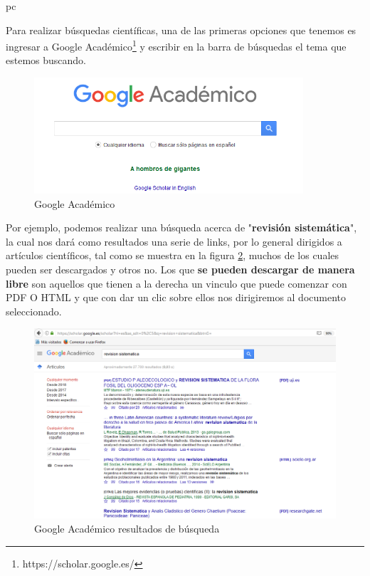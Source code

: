 pc\documentclass[a4paper,12pt,openany]{book}
\begin{document}
\begin{itemize}
Para realizar búsquedas científicas, una de las primeras opciones que tenemos es ingresar a Google Académico\footnote{https://scholar.google.es/} y escribir en la barra de búsquedas el tema que estemos buscando.

\begin{figure}[ht]
  \centering
	\includegraphics[width=10cm]{google2.png}
\caption{Google Académico}
  \label{fig:google2}
\end{figure}

Por ejemplo, podemos realizar una búsqueda acerca de "\textbf{revisión sistemática}", la cual nos dará como resultados una serie de links, por lo general dirigidos a artículos científicos, tal como se muestra en la figura \ref{fig:google33}, muchos de los cuales pueden ser descargados y otros no. Los que \textbf{se pueden descargar de manera libre} son aquellos que tienen a la derecha un vinculo que puede comenzar con PDF O HTML y que con dar un clic sobre ellos nos dirigiremos al documento seleccionado. \\

\begin{figure}[ht]
  \centering
	\includegraphics[width=14cm]{google3.png}
\caption{Google Académico resultados de búsqueda}
  \label{fig:google33}
\end{figure}


\end{itemize}
\end{document}
